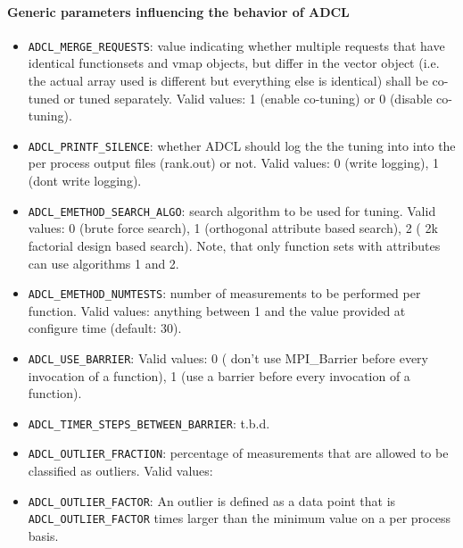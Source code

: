 \paragraph{Generic parameters influencing the behavior of ADCL}
\begin{itemize}
\item {\tt ADCL\_MERGE\_REQUESTS}: value indicating whether multiple requests
that have identical functionsets and vmap objects, but differ in the vector
object (i.e. the actual array used is different but everything else is
identical) shall be co-tuned or tuned separately. Valid values: 1 (enable
co-tuning) or 0 (disable co-tuning).

\item{\tt ADCL\_PRINTF\_SILENCE}: whether ADCL should log the the tuning into into
  the per process output files (rank.out) or not. Valid values: 0 (write
  logging), 1 (dont write logging).

\item {\tt ADCL\_EMETHOD\_SEARCH\_ALGO}: search algorithm to be used for
  tuning. Valid values: 0 (brute force search), 1 (orthogonal attribute based
  search), 2 ( 2k factorial design based search). Note, that only function
  sets with attributes can use algorithms 1 and 2.

\item{\tt ADCL\_EMETHOD\_NUMTESTS}: number of measurements to be performed per
  function. Valid values: anything between 1 and the value provided at
  configure time (default: 30).

\item{\tt ADCL\_USE\_BARRIER}: Valid values: 0 ( don't use  MPI\_Barrier
  before every invocation of a function), 1 (use a barrier before every
  invocation of a function).

\item {\tt ADCL\_TIMER\_STEPS\_BETWEEN\_BARRIER}: t.b.d.

\item{\tt ADCL\_OUTLIER\_FRACTION}: percentage of measurements that are
  allowed to be classified as outliers. Valid values: 
\item{\tt ADCL\_OUTLIER\_FACTOR}:  An outlier is defined as a data point that
  is {\tt ADCL\_OUTLIER\_FACTOR} times larger than the minimum value on a per
  process basis.

\end{itemize}



